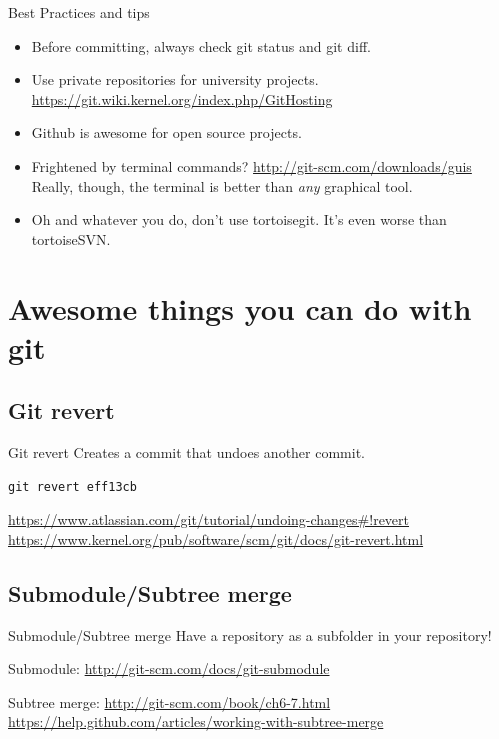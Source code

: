 \documentclass[10pt,a4paper]{beamer}
\begin{document}
\begin{frame}[fragile]{Best Practices and tips}
\begin{itemize}
\item Before committing, always check git status and git diff.
\pause
\item Use private repositories for university projects.
\href{http://git-scm.com/downloads/guis}{\color{blue}https://git.wiki.kernel.org/index.php/GitHosting}
\item Github is awesome for open source projects.
\pause
\item Frightened by terminal commands?
\href{http://git-scm.com/downloads/guis}{\color{blue}http://git-scm.com/downloads/guis} \\
Really, though, the terminal is better than \textit{any} graphical tool.
\pause
\item Oh and whatever you do, don't use tortoisegit. It's even worse than tortoiseSVN.
\end{itemize}
\end{frame}


\section{Awesome things you can do with git}

\subsection{Git revert}
\begin{frame}[fragile]{Git revert}
Creates a commit that undoes another commit.
\begin{verbatim}git revert eff13cb\end{verbatim}
\href{https://www.atlassian.com/git/tutorial/undoing-changes#!revert}{\color{blue}https://www.atlassian.com/git/tutorial/undoing-changes\#!revert}
\href{https://www.kernel.org/pub/software/scm/git/docs/git-revert.html}{\color{blue}https://www.kernel.org/pub/software/scm/git/docs/git-revert.html}

\end{frame}

\subsection{Submodule/Subtree merge}
\begin{frame}{Submodule/Subtree merge}
Have a repository as a subfolder in your repository!

Submodule:
\href{http://git-scm.com/docs/git-submodule}{\color{blue}http://git-scm.com/docs/git-submodule}

Subtree merge:
\href{http://git-scm.com/book/ch6-7.html}{\color{blue}http://git-scm.com/book/ch6-7.html}
\href{https://help.github.com/articles/working-with-subtree-merge}{\color{blue}https://help.github.com/articles/working-with-subtree-merge}
\end{frame}
\end{document}
